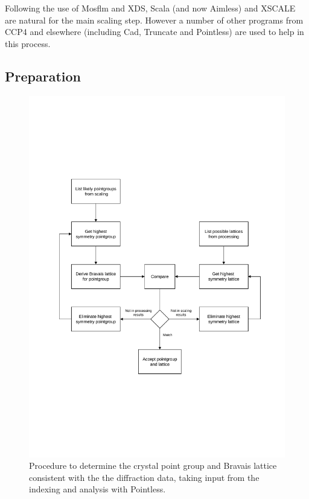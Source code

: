 \documentclass[preprint,pdf]{iucr}
\begin{document}
Following the use of Mosflm and XDS, Scala (and now Aimless) and
XSCALE are natural for the main scaling step. However a number of other
programs from CCP4 and elsewhere (including Cad, Truncate and
Pointless) are used to help in this process.

\subsection{Preparation}

\begin{figure}
\caption{Procedure to determine the crystal point group and Bravais
  lattice consistent with the the diffraction data, taking input from
  the indexing and analysis with Pointless.
\label{figure:scaling_1}}
\centering
\includegraphics[scale=0.5]{figures/scaling-step-1.pdf}
\end{figure}
\end{document}
